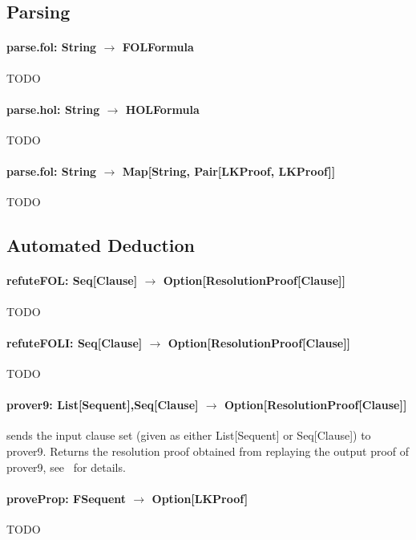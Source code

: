\documentclass[a4paper, 11pt]{report}
\begin{document}
\subsection{Parsing}

\paragraph{\textbf{parse.fol: String $\rightarrow$ FOLFormula}}
{\color{red}TODO}

\paragraph{\textbf{parse.hol: String $\rightarrow$ HOLFormula}}
{\color{red}TODO}

\paragraph{\textbf{parse.fol: String $\rightarrow$ Map[String, Pair[LKProof, LKProof]]}}
{\color{red}TODO}

\subsection{Automated Deduction}
  
\paragraph{\textbf{refuteFOL: Seq[Clause] $\rightarrow$ Option[ResolutionProof[Clause]]}}
{\color{red}TODO}

\paragraph{\textbf{refuteFOLI: Seq[Clause] $\rightarrow$ Option[ResolutionProof[Clause]]}}
{\color{red}TODO}

\paragraph{\textbf{prover9: List[Sequent],Seq[Clause] $\rightarrow$ Option[ResolutionProof[Clause]]}}
sends the input clause set (given as either List[Sequent] or Seq[Clause]) to prover9. Returns
the resolution proof obtained from replaying the output proof of prover9,
see~\cite{Dunchev12System} for details.

\paragraph{\textbf{proveProp: FSequent $\rightarrow$ Option[LKProof]}}
{\color{red}TODO}
\end{document}

